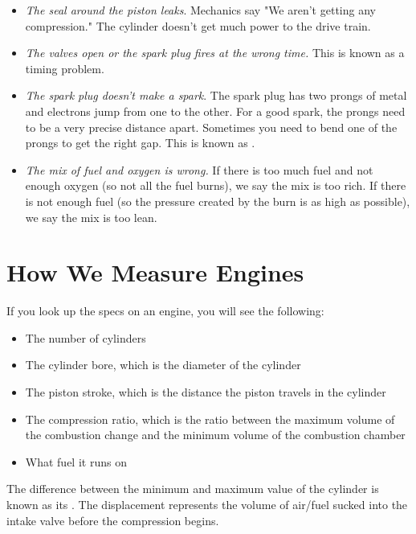 \begin{itemize}

\item \textit{The seal around the piston leaks}. Mechanics say "We aren't getting any compression." The cylinder doesn't get much power to the drive train.

\item \textit{The valves open or the spark plug fires at the wrong time.} This is known as a timing problem. 

\item \textit{The spark plug doesn't make a spark}. The spark plug has two prongs of metal and electrons jump from one to the other. For a good spark, the prongs need to be a very precise distance apart. Sometimes you need to bend one of the prongs to get the right gap. This is known as .

\item \textit{The mix of fuel and oxygen is wrong.} If there is too much fuel and not enough oxygen (so not all the fuel burns), we say the mix is too rich. If there is not enough fuel (so the pressure created by the burn is as high as possible), we say the mix is too lean.

\end{itemize}

\section{How We Measure Engines}

If you look up the specs on an engine, you will see the following:

\begin{itemize}
\item The number of cylinders
\item The cylinder bore, which is the diameter of the cylinder
\item The piston stroke, which is the distance the piston travels in the cylinder
\item The compression ratio, which is the ratio between the maximum volume of the combustion change and the minimum volume of the combustion chamber
\item What fuel it runs on
\end{itemize}

The difference between the minimum and maximum value of the cylinder is known as its . The displacement represents the volume of air/fuel sucked into the intake valve 
before the compression begins.

